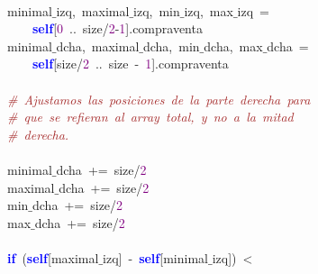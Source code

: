 \mbox{} \\
\mbox{}\ \ \ \ \ \ \ \ minimal$\_$izq\textcolor{BrickRed}{,}\ maximal$\_$izq\textcolor{BrickRed}{,}\ min$\_$izq\textcolor{BrickRed}{,}\ max$\_$izq\ \textcolor{BrickRed}{=}\  \\
\mbox{}\ \ \ \ \ \ \ \ \ \ \ \ \textbf{\textcolor{Blue}{self}}\textcolor{BrickRed}{[}\textcolor{Purple}{0}\ \textcolor{BrickRed}{..}\ size\textcolor{BrickRed}{/}\textcolor{Purple}{2}\textcolor{BrickRed}{-}\textcolor{Purple}{1}\textcolor{BrickRed}{].}compraventa\  \\
\mbox{}\ \ \ \ \ \ \ \ minimal$\_$dcha\textcolor{BrickRed}{,}\ maximal$\_$dcha\textcolor{BrickRed}{,}\ min$\_$dcha\textcolor{BrickRed}{,}\ max$\_$dcha\ \textcolor{BrickRed}{=}\  \\
\mbox{}\ \ \ \ \ \ \ \ \ \ \ \ \textbf{\textcolor{Blue}{self}}\textcolor{BrickRed}{[}size\textcolor{BrickRed}{/}\textcolor{Purple}{2}\ \textcolor{BrickRed}{..}\ size\ \textcolor{BrickRed}{-}\ \textcolor{Purple}{1}\textcolor{BrickRed}{].}compraventa \\
\mbox{} \\
\mbox{}\ \ \ \ \ \ \ \ \textit{\textcolor{Brown}{\#\ Ajustamos\ las\ posiciones\ de\ la\ parte\ derecha\ para}} \\
\mbox{}\ \ \ \ \ \ \ \ \textit{\textcolor{Brown}{\#\ que\ se\ refieran\ al\ array\ total,\ y\ no\ a\ la\ mitad\ }} \\
\mbox{}\ \ \ \ \ \ \ \ \textit{\textcolor{Brown}{\#\ derecha.\ }} \\
\mbox{} \\
\mbox{}\ \ \ \ \ \ \ \ minimal$\_$dcha\ \textcolor{BrickRed}{+=}\ size\textcolor{BrickRed}{/}\textcolor{Purple}{2} \\
\mbox{}\ \ \ \ \ \ \ \ maximal$\_$dcha\ \textcolor{BrickRed}{+=}\ size\textcolor{BrickRed}{/}\textcolor{Purple}{2} \\
\mbox{}\ \ \ \ \ \ \ \ min$\_$dcha\ \textcolor{BrickRed}{+=}\ size\textcolor{BrickRed}{/}\textcolor{Purple}{2} \\
\mbox{}\ \ \ \ \ \ \ \ max$\_$dcha\ \textcolor{BrickRed}{+=}\ size\textcolor{BrickRed}{/}\textcolor{Purple}{2} \\
\mbox{} \\
\mbox{}\ \ \ \ \ \ \ \ \textbf{\textcolor{Blue}{if}}\ \textcolor{BrickRed}{(}\textbf{\textcolor{Blue}{self}}\textcolor{BrickRed}{[}maximal$\_$izq\textcolor{BrickRed}{]}\ \textcolor{BrickRed}{-}\ \textbf{\textcolor{Blue}{self}}\textcolor{BrickRed}{[}minimal$\_$izq\textcolor{BrickRed}{])}\ \textcolor{BrickRed}{\textless{}}\  \\
